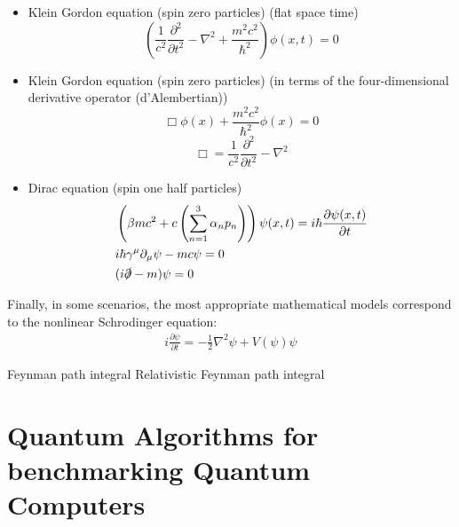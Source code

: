 \documentclass[]{article}
\begin{document}
\begin{itemize}
\item Klein Gordon equation (spin zero particles) (flat space time)
\begin{equation}
\left(\frac{1}{c^2}\frac{\partial^2}{\partial t^2} - \nabla^2 + \frac{m^2 c^2}{\hbar^2}\right) \phi(x,t) = 0
\end{equation}
\item Klein Gordon equation (spin zero particles) (in terms of the four-dimensional derivative operator (d'Alembertian))
\begin{equation}
\Box \phi(x) + \frac{m^2 c^2}{\hbar^2} \phi(x) = 0
\end{equation}
\begin{equation}
\Box=\frac{1}{c^{2}}\frac{\partial^{2}}{\partial t^{2}}-\nabla^{2}
\end{equation}
\item Dirac equation (spin one half particles)
\begin{align}
& \left(\beta m c^2 + c \left(\sum_{n=1}^3\alpha_n p_n\right)\right) \psi(x,t) = i\hbar \frac{\partial \psi(x,t)}{\partial t}\\
& i\hbar\gamma^\mu \partial_\mu \psi - mc\psi = 0 \\
& (i\slashed{\partial} - m)\psi = 0
\end{align}
\end{itemize}

Finally, in some scenarios, the most appropriate mathematical models 
correspond to the nonlinear Schrodinger equation:
\begin{eqnarray*}
i\frac{\partial \psi}{\partial t} = -\frac{1}{2} \nabla^2 \psi + V(\psi) \psi
\end{eqnarray*}

Feynman path integral\cite{beau2012feynman}
Relativistic Feynman path integral\cite{struckmeier2024relativistic}



\begin{comment}
	1. PDE constrained optimization and control. QUANDARY
	  (PDE constraint is Schrodinger equation)
	  Anders Petersson and Stefanie Guenther
	2. Quantum algorithms for benchmarking quantum computers
	   Shi Jin, Antigoni Georgiadou
	3. Quantum error correction algorithms
	   Eric Kubischta
	4. Density functional theory
	   Lin Lin
\end{comment}

\section{Quantum Algorithms for benchmarking Quantum Computers}
\end{document}
